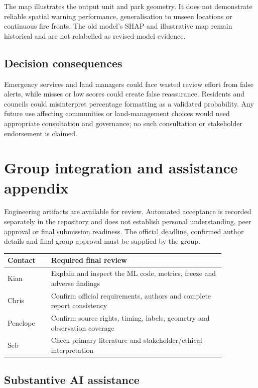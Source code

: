 The map illustrates the output unit and park geometry. It does not demonstrate reliable spatial warning performance, generalisation to unseen locations or continuous fire fronts. The old model's SHAP and illustrative map remain historical and are not relabelled as revised-model evidence.

\subsection*{Decision consequences}

Emergency services and land managers could face wasted review effort from false alerts, while misses or low scores could create false reassurance. Residents and councils could misinterpret percentage formatting as a validated probability. Any future use affecting communities or land-management choices would need appropriate consultation and governance; no such consultation or stakeholder endorsement is claimed.

\clearpage
\section*{Group integration and assistance appendix}
Engineering artifacts are available for review. Automated acceptance is recorded separately in the repository and does not establish personal understanding, peer approval or final submission readiness. The official deadline, confirmed author details and final group approval must be supplied by the group.

\begin{center}\small\setlength{\tabcolsep}{3pt}
\begin{tabular}{p{0.172\linewidth}p{0.688\linewidth}}
\hline
Contact & Required final review \\ \hline
Kian & Explain and inspect the ML code, metrics, freeze and adverse findings \\
Chris & Confirm official requirements, authors and complete report consistency \\
Penelope & Confirm source rights, timing, labels, geometry and observation coverage \\
Seb & Check primary literature and stakeholder/ethical interpretation \\
\hline\end{tabular}\end{center}

\subsection*{Substantive AI assistance}

